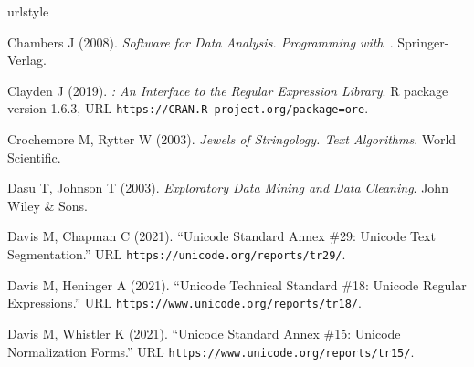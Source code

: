 \documentclass[nojss]{jss}
\begin{document}

\begin{thebibliography}{35}
\newcommand{\enquote}[1]{``#1''}
\providecommand{\natexlab}[1]{#1}
\providecommand{\url}[1]{\texttt{#1}}
\providecommand{\urlprefix}{URL }
\expandafter\ifx\csname urlstyle\endcsname\relax
  \providecommand{\doi}[1]{doi:\discretionary{}{}{}#1}\else
  \providecommand{\doi}{doi:\discretionary{}{}{}\begingroup
  \urlstyle{rm}\Url}\fi
\providecommand{\eprint}[2][]{\url{#2}}

Chambers J (2008).
\newblock \emph{Software for Data Analysis. {P}rogramming with~}.
\newblock Springer-Verlag.

Clayden J (2019).
\newblock \emph{: {A}n  Interface to the 
  Regular Expression Library}.
\newblock R package version 1.6.3,
  \urlprefix\url{https://CRAN.R-project.org/package=ore}.

Crochemore M, Rytter W (2003).
\newblock \emph{Jewels of Stringology. {T}ext Algorithms}.
\newblock World Scientific.

Dasu T, Johnson T (2003).
\newblock \emph{Exploratory Data Mining and Data Cleaning}.
\newblock John Wiley \& Sons.

Davis M, Chapman C (2021).
\newblock \enquote{Unicode Standard Annex \#29: Unicode Text Segmentation.}
\newblock \urlprefix\url{https://unicode.org/reports/tr29/}.

Davis M, Heninger A (2021).
\newblock \enquote{Unicode Technical Standard \#18: Unicode Regular
  Expressions.}
\newblock \urlprefix\url{https://www.unicode.org/reports/tr18/}.

Davis M, Whistler K (2021).
\newblock \enquote{Unicode Standard Annex \#15: Unicode Normalization Forms.}
\newblock \urlprefix\url{https://www.unicode.org/reports/tr15/}.


\end{thebibliography}
\end{document}
